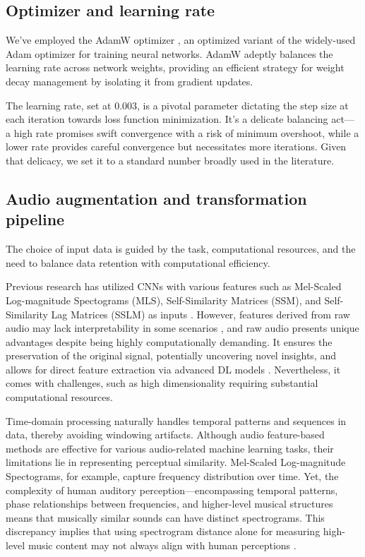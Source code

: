 

\subsection{Optimizer and learning rate}

We've employed the AdamW optimizer \cite{Loshchilov2017DecoupledRegularization}, an optimized variant of the widely-used Adam optimizer for training neural networks. AdamW adeptly balances the learning rate across network weights, providing an efficient strategy for weight decay management by isolating it from gradient updates. 

The learning rate, set at 0.003, is a pivotal parameter dictating the step size at each iteration towards loss function minimization. It's a delicate balancing act— a high rate promises swift convergence with a risk of minimum overshoot, while a lower rate provides careful convergence but necessitates more iterations. Given that delicacy, we set it to a standard number broadly used in the literature.

\subsection{Audio augmentation and transformation pipeline}

The choice of input data is guided by the task, computational resources, and the need to balance data retention with computational efficiency.

Previous research has utilized CNNs with various features such as Mel-Scaled Log-magnitude Spectograms (MLS), Self-Similarity Matrices (SSM), and Self-Similarity Lag Matrices (SSLM) as inputs \cite{Hernandez-Olivan2021MusicFeatures}. However, features derived from raw audio may lack interpretability in some scenarios \cite{Schindler2020DeepTutorial}, and raw audio presents unique advantages despite being highly computationally demanding. It ensures the preservation of the original signal, potentially uncovering novel insights, and allows for direct feature extraction via advanced DL models \cite{learning, verydeep}. Nevertheless, it comes with challenges, such as high dimensionality requiring substantial computational resources. 

Time-domain processing naturally handles temporal patterns and sequences in data, thereby avoiding windowing artifacts. Although audio feature-based methods are effective for various audio-related machine learning tasks, their limitations lie in representing perceptual similarity. Mel-Scaled Log-magnitude Spectograms, for example, capture frequency distribution over time. Yet, the complexity of human auditory perception—encompassing temporal patterns, phase relationships between frequencies, and higher-level musical structures means that musically similar sounds can have distinct spectrograms. This discrepancy implies that using spectrogram distance alone for measuring high-level music content may not always align with human perceptions \cite{Kim2020OneStrategies, Mesostructures2023}.

